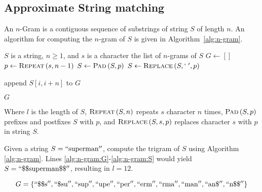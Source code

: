 	\subsection{Approximate String matching}
	\label{sec:n-gram}
		\begin{defn}[N-Gram]
			An $n$-Gram is a contiguous sequence of substrings of string $S$ of length $n$.  An algorithm for computing the $n$-gram of $S$ is given in Algorithm~\ref{alg:n-gram}. 
		\end{defn}
		

		\begin{algorithm}[!ht]
			\caption{$\textsc{N-Gram}\left(S, n, s\right)$}
			\label{alg:n-gram}
			
				\begin{algorithmic}[1]
					\REQUIRE $S$ is a string, $n \ge 1$, and $s$ is a character
					\ENSURE the list of $n$-grams of $S$
					\medskip
					\STATE $G \leftarrow \left[\right]$\label{alg:n-gram:G}
					\STATE $p \leftarrow \textsc{Repeat}\left(s, n - 1\right)$
					\STATE $S \leftarrow \textsc{Pad}\left(S, p\right)$
					\STATE $S \leftarrow \textsc{Replace}\left(S, `\;', p\right)$\label{alg:n-gram:S}
					
						\STATE append $S\left[i, i + n\right]$ to $G$
					\ENDFOR
					
					\RETURN $G$
				\end{algorithmic}
		\end{algorithm}
		
		
		Where $l$ is the length of $S$, $\textsc{Repeat}\left(S, n\right)$ repeats $s$ character $n$ times, $\textsc{Pad}\left(S, p\right)$ prefixes and postfixes $S$ with $p$, and $\textsc{Replace}\left(S, s, p\right)$ replaces character $s$ with $p$ in string $S$.
		
		\begin{ex}
		\label{ex:ngram-banana}
			Given a string $S = \mathrm{``superman''}$, compute the trigram of $S$ using Algorithm \ref{alg:n-gram}.  Lines \ref{alg:n-gram:G}-\ref{alg:n-gram:S} would yield $S = \mathrm{``\char"24\char"24superman\char"24\char"24''}$, resulting in $l = 12$.
			
			$$
				G = \left\{
					\mathrm{``\char"24\char"24s''},
					\mathrm{``\char"24su''},
					\mathrm{``sup''},
					\mathrm{``upe''},
					\mathrm{``per''},
					\mathrm{``erm''},
					\mathrm{``rma''},
					\mathrm{``man''},
					\mathrm{``an\char"24''},
					\mathrm{``n\char"24\char"24''}
				\right\}
			$$
		\end{ex}
		
